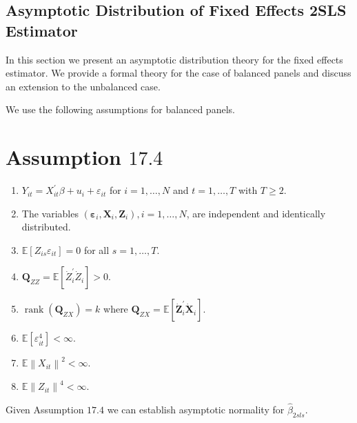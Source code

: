 \documentclass[10pt]{article}
\begin{document}
\subsection{Asymptotic Distribution of Fixed Effects 2SLS Estimator}
In this section we present an asymptotic distribution theory for the fixed effects estimator. We provide a formal theory for the case of balanced panels and discuss an extension to the unbalanced case.

We use the following assumptions for balanced panels.

\section{Assumption $17.4$}
\begin{enumerate}
  \item $Y_{i t}=X_{i t}^{\prime} \beta+u_{i}+\varepsilon_{i t}$ for $i=1, \ldots, N$ and $t=1, \ldots, T$ with $T \geq 2$.

  \item The variables $\left(\boldsymbol{\varepsilon}_{i}, \boldsymbol{X}_{i}, \boldsymbol{Z}_{i}\right), i=1, \ldots, N$, are independent and identically distributed.

  \item $\mathbb{E}\left[Z_{i s} \varepsilon_{i t}\right]=0$ for all $s=1, \ldots, T$.

  \item $\boldsymbol{Q}_{Z Z}=\mathbb{E}\left[\dot{Z}_{i}^{\prime} \dot{Z}_{i}\right]>0$.

  \item $\operatorname{rank}\left(\boldsymbol{Q}_{Z X}\right)=k$ where $\boldsymbol{Q}_{Z X}=\mathbb{E}\left[\dot{\boldsymbol{Z}}_{i}^{\prime} \dot{\boldsymbol{X}}_{i}\right]$.

  \item $\mathbb{E}\left[\varepsilon_{i t}^{4}\right]<\infty$.

  \item $\mathbb{E}\left\|X_{i t}\right\|^{2}<\infty$.

  \item $\mathbb{E}\left\|Z_{i t}\right\|^{4}<\infty$.

\end{enumerate}
Given Assumption $17.4$ we can establish asymptotic normality for $\widehat{\beta}_{2 s l s}$.
\end{document}
